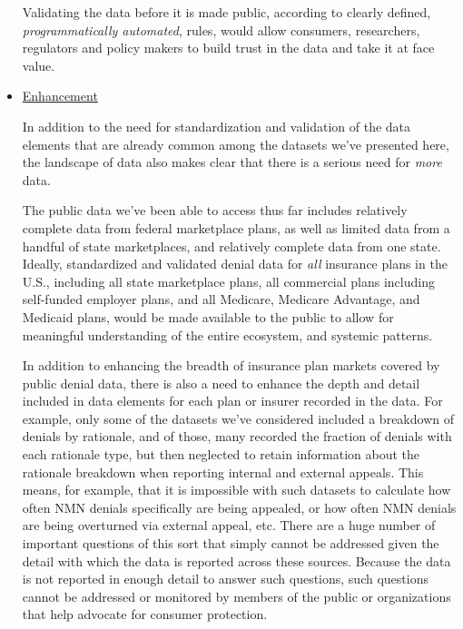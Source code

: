 \documentclass[12pt, a4paper,twoside,parskip=full]{report}
\theoremstyle{plain} %
\theoremstyle{definition} %
\theoremstyle{remark} %
\numberwithin{equation}{chapter}
\begin{document}
\begin{itemize}
			
			Validating the data before it is made public, according to clearly defined, \emph{programmatically automated},
			rules, would allow consumers, researchers, regulators and policy makers to build trust in the
			data and take it at face value.
			
			\item \underline{Enhancement}
			
			In addition to the need for standardization and validation of the data elements that are already common among the datasets we've presented here, the landscape of data also makes clear that there is a serious need for \emph{more} data.
			
			  The public data we've been able to access thus far includes relatively complete data from federal marketplace
			plans, as well as limited data from a handful of state marketplaces, and relatively complete data from one
			state. Ideally, standardized and validated denial data for \emph{all} insurance plans in the U.S., including all state marketplace plans, 
			all commercial plans including self-funded employer plans, and all Medicare, Medicare Advantage, and Medicaid plans, would be made available to the public to allow 
			for meaningful understanding of the entire ecosystem, and systemic patterns.
			
			
			In addition to enhancing the breadth of insurance plan markets covered by public denial data, there is also a need to enhance the depth and detail included in data elements for each plan or insurer recorded in the data. For example, only some of the datasets we've considered included a breakdown of denials by rationale, and of those, many recorded the fraction of denials with each rationale type, but then neglected to retain information about the rationale breakdown when reporting internal and external appeals. This means, for example, that it is impossible with such datasets to calculate how often NMN denials specifically are being appealed, or how often NMN denials are being overturned via external appeal, etc. There are a huge number of important questions of this sort that simply cannot
			be addressed given the detail with which the data is reported across these sources. Because the data is not reported 
			in enough detail to answer such questions, such questions cannot be addressed or monitored by members of the public 
			or organizations that help advocate for consumer protection.
			
		\end{itemize}
		
\end{document}
